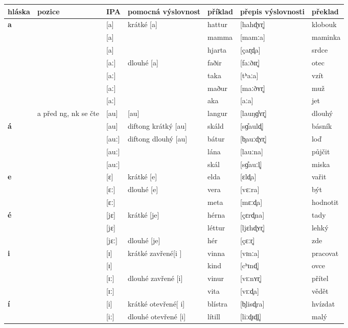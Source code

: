 \begin{longtable}{>{\bfseries}lX>{\IPAfont}lXl>{\IPAfont}ll}
\toprule
  \textbf{hláska} & \textbf{pozice} & \normalfont\textbf{IPA} & \textbf{pomocná výslovnost} & \textbf{příklad} & \normalfont\textbf{přepis výslovnosti} & \textbf{překlad} \\
\midrule
\endhead
a &  & {[a]} & krátké [a] & hattur & {[hahd̥ʏr̥]} & klobouk \\ 
 &  & {[a]} &  & mamma & {[mamːa]} & maminka \\ 
 &  & {[a]} &  & hjarta & {[çar̥d̥a]} & srdce \\ 
 &  & {[aː]} & dlouhé [a] & faðir & {[faːðɪr̥]} & otec \\ 
 &  & {[aː]} &  & taka & {[tʰaːa]} & vzít \\ 
 &  & {[aː]} &  & maður & {[maːðʏr̥]} & muž \\ 
 &  & {[aː]} &  & aka & {[aːa]} & jet \\ 
 & a před ng, nk se čte & {[au]} & [au] & langur & {[lauŋɡ̊ʏr̥]} & dlouhý \\ 
á &  & {[au]} & diftong krátký [au] & skáld & {[sɡ̊auld̥]} & básník \\ 
 &  & {[auː]} & diftong dlouhý [au] & bátur & {[b̥auːd̥ʏr̥]} & loď \\ 
 &  & {[auː]} &  & lána & {[lauːna]} & půjčit \\ 
 &  & {[auː]} &  & skál  & {[sɡ̊auːl̥]} & miska \\ 
e &  & {[ɛ]} & krátké [e] & elda & {[ɛld̥a]} & vařit \\ 
 &  & {[ɛː]} & dlouhé [e] & vera & {[vɛːra]} & být \\ 
 &  & {[ɛː]} &  & meta & {[mɛːd̥a]} & hodnotit \\ 
é &  & {[jɛ]} & krátké [je] & hérna & {[çɛrd̥na]} & tady \\ 
 &  & {[jɛ]} &  & léttur & {[ljɛhd̥ʏr̥]} & lehký \\ 
 &  & {[jɛː]} & dlouhé [je] & hér & {[çɛːr̥]} & zde \\ 
i &  & {[ɪ]} & krátké zavřené[i ] & vinna & {[vɪnːa]} & pracovat \\ 
 &  & {[ɪ]} &  & kind & {[cʰɪnd̥]} & ovce \\ 
 &  & {[ɪː]} & dlouhé zavřené [i] & vinur & {[vɪːnʏr̥]} & přítel \\ 
 &  & {[ɪː]} &  & vita & {[vɪːd̥a]} & vědět \\ 
í &  & {[i]} & krátké otevřené[ i] & blístra & {[b̥lisd̥ra]} & hvízdat \\ 
 &  & {[iː]} & dlouhé otevřené [i] & lítill & {[liːd̥ɪd̥l̥]} & malý \\ 

\end{longtable}
